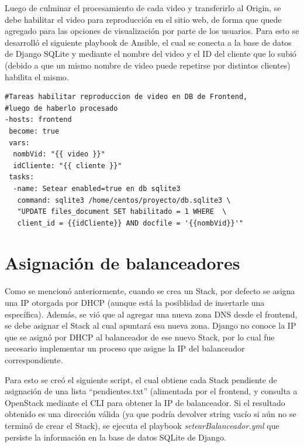 \documentclass[12pt,a4paper,oneside]{book}
\begin{document}
Luego de culminar el procesamiento de cada video y transferirlo al Origin, se debe habilitar el video para reproducción en el sitio web, de forma que quede agregado para las opciones de visualización por parte de los usuarios. Para esto se desarrolló el siguiente playbook de Ansible, el cual se conecta a la base de datos de Django SQLite y mediante el nombre del video y el ID del cliente que lo subió (debido a que un mismo nombre de video puede repetirse por distintos clientes) habilita el mismo.

\vspace{0.5cm}
\begin{lstlisting}[style=codigobase,  caption= habilitarVideo.yaml]
#Tareas habilitar reproduccion de video en DB de Frontend, 
#luego de haberlo procesado
-hosts: frontend
 become: true
 vars:
  nombVid: "{{ video }}"
  idCliente: "{{ cliente }}"
 tasks:
  -name: Setear enabled=true en db sqlite3
   command: sqlite3 /home/centos/proyecto/db.sqlite3 \
   "UPDATE files_document SET habilitado = 1 WHERE  \
   client_id = {{idCliente}} AND docfile = '{{nombVid}}'"
\end{lstlisting}
\vspace{0.5cm}


\section{Asignación de balanceadores}
\label{seccC.4}
Como se mencionó anteriormente, cuando se crea un Stack, por defecto se asigna una IP otorgada por DHCP (aunque está la posiblidad de insertarle una específica). Además, se vió que al agregar una nueva zona DNS desde el frontend, se debe asignar el Stack al cual apuntará esa nueva zona. Django no conoce la IP que se asignó por DHCP al balanceador de ese nuevo Stack, por lo cual fue necesario implementar un proceso que asigne la IP del balanceador correspondiente.

\vspace{0.5cm}

Para esto se creó el siguiente script, el cual obtiene cada Stack pendiente de asignación de una lista ``pendientes.txt'' (alimentada por el frontend, y consulta a OpenStack mediante el CLI para obtener la IP de balanceador. Si el resultado obtenido es una dirección válida (ya que podría devolver string vacío si aún no se terminó de crear el Stack), se ejecuta el playbook \textit{setearBalanceador.yml} que persiste la información en la base de datos SQLite de Django.
\end{document}
